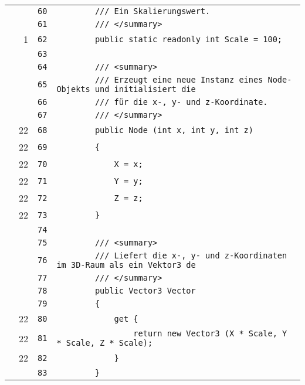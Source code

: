 \documentclass[a4paper,10pt]{article}
\begin{document}
\begin{longtable}[l]{lrrl}
\cellcolor{gray} &  & \verb~60~ & \verb~        /// Ein Skalierungswert.~\\
\cellcolor{gray} &  & \verb~61~ & \verb~        /// </summary>~\\
\cellcolor{green} & 1 & \verb~62~ & \verb~        public static readonly int Scale = 100;~\\
\cellcolor{gray} &  & \verb~63~ & \verb~~\\
\cellcolor{gray} &  & \verb~64~ & \verb~        /// <summary>~\\
\cellcolor{gray} &  & \verb~65~ & \verb~        /// Erzeugt eine neue Instanz eines Node-Objekts und initialisiert die~\\
\cellcolor{gray} &  & \verb~66~ & \verb~        /// für die x-, y- und z-Koordinate.~\\
\cellcolor{gray} &  & \verb~67~ & \verb~        /// </summary>~\\
\cellcolor{green} & 22 & \verb~68~ & \verb~        public Node (int x, int y, int z)~\\
\cellcolor{green} & 22 & \verb~69~ & \verb~        {~\\
\cellcolor{green} & 22 & \verb~70~ & \verb~            X = x;~\\
\cellcolor{green} & 22 & \verb~71~ & \verb~            Y = y;~\\
\cellcolor{green} & 22 & \verb~72~ & \verb~            Z = z;~\\
\cellcolor{green} & 22 & \verb~73~ & \verb~        }~\\
\cellcolor{gray} &  & \verb~74~ & \verb~~\\
\cellcolor{gray} &  & \verb~75~ & \verb~        /// <summary>~\\
\cellcolor{gray} &  & \verb~76~ & \verb~        /// Liefert die x-, y- und z-Koordinaten im 3D-Raum als ein Vektor3 de~\\
\cellcolor{gray} &  & \verb~77~ & \verb~        /// </summary>~\\
\cellcolor{gray} &  & \verb~78~ & \verb~        public Vector3 Vector~\\
\cellcolor{gray} &  & \verb~79~ & \verb~        {~\\
\cellcolor{green} & 22 & \verb~80~ & \verb~            get {~\\
\cellcolor{green} & 22 & \verb~81~ & \verb~                return new Vector3 (X * Scale, Y * Scale, Z * Scale);~\\
\cellcolor{green} & 22 & \verb~82~ & \verb~            }~\\
\cellcolor{gray} &  & \verb~83~ & \verb~        }~\\

\end{longtable}
\end{document}
